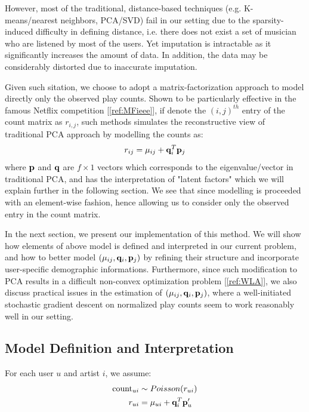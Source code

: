 \documentclass[11pt]{article}
\theoremstyle{definition}
\begin{document}
However, most of the traditional, distance-based techniques (e.g. K-means/nearest neighbors, PCA/SVD) fail in our setting due to the sparsity-induced difficulty in defining distance, i.e. there does not exist a set of musician who are listened by most of the users. Yet imputation is intractable as it significantly increases the amount of data. In addition, the data may be considerably distorted due to inaccurate imputation.

Given such sitation, we choose to adopt a matrix-factorization approach to model directly only the observed play counts. Shown to be particularly effective in the famous Netflix competition [\ref{ref:MFieee}], if denote the $(i, j)^{th}$ entry of the count matrix as $r_{i,j}$, such methods simulates the reconstructive view of traditional PCA approach by modelling the counts as:
$$r_{ij} = \mu_{ij} + {\bf q}_i^T {\bf p}_j$$
where ${\bf p}$ and ${\bf q}$ are $f \times 1$ vectors which corresponds to the eigenvalue/vector in traditional PCA, and has the interpretation of "latent factors" which we will explain further in the following section. We see that since modelling is proceeded with an element-wise fashion, hence allowing us to consider only the observed entry in the count matrix. 

In the next section, we present our implementation of this method. We will show how elements of above model is defined and interpreted in our current problem, and how to better model $(\mu_{ij}, {\bf q}_i, {\bf p}_j)$ by refining their structure and incorporate user-specific demographic informations. Furthermore, since such modification to PCA results in a difficult non-convex optimization problem [\ref{ref:WLA}], we also discuss practical issues in the estimation of $(\mu_{ij}, {\bf q}_i, {\bf p}_j)$, where a well-initiated stochastic gradient descent on normalized play counts seem to work reasonably well in our setting.

\newpage

\subsection{\textbf{Model Definition and Interpretation}}

For each user $u$ and artist $i$, we assume:
\begin{align}
\mbox{count}_{ui} &\sim Poisson(r_{ui}) \nonumber \\
r_{ui} & = \mu_{ui} + {\bf q}_i^T {\bf p}'_u \label{eq:original model}
\end{align}
\end{document}
